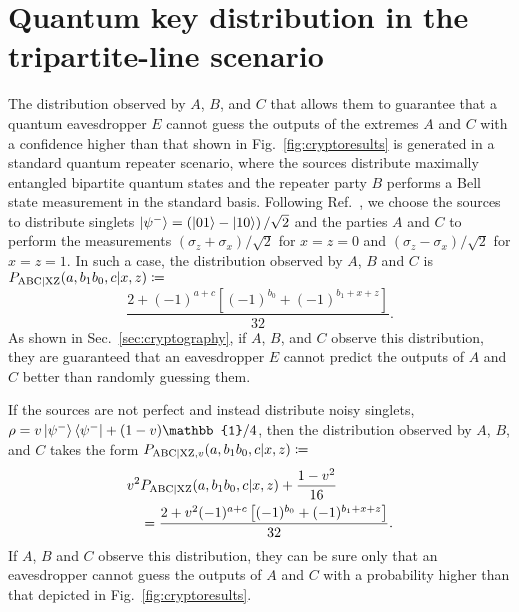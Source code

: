 \documentclass[superscriptaddress,aps,prx,nofootinbib,twocolumn,twoside,reprint,letterpaper,longbibliography]{revtex4-2}
\def\id{\boldsymbol{\mathbb{1}}}
\begin{document}
\section{Quantum key distribution in the tripartite-line scenario}\label{app:crypto}
The distribution observed by $A$, $B$, and $C$ that allows them to guarantee that a quantum eavesdropper $E$ cannot guess the outputs of the extremes $A$ and $C$ with a confidence higher than that shown in Fig.~\ref{fig:cryptoresults} is generated in a standard quantum repeater scenario, where the sources distribute maximally entangled bipartite quantum states and the repeater party $B$ performs a Bell state measurement in the standard basis.
Following Ref.~\cite{lee2018crypto}, we choose the sources to distribute singlets $\ket{\psi^-}=\left(\ket{01}-\ket{10}\right)/\sqrt{2}$ and the parties $A$ and $C$ to perform the measurements $\left(\sigma_z+\sigma_x\right)/\sqrt{2}$ for $x{=}z{=}0$ and $\left(\sigma_z-\sigma_x\right)/\sqrt{2}$ for $x{=}z{=}1$.
In such a case, the distribution observed by $A$, $B$ and $C$ is $P_{\text{ABC{\textbar}XZ}}(a,b_1b_0,c|x,z)\coloneqq$
\begin{equation*}
    \frac{2+(-1)^{a+c}\left[(-1)^{b_0}+(-1)^{b_1+x+z}\right]}{32}.
\end{equation*}
As shown in Sec.~\ref{sec:cryptography}, if $A$, $B$, and $C$ observe this distribution, they are guaranteed that an eavesdropper $E$ cannot predict the outputs of $A$ and $C$ better than randomly guessing them.

If the sources are not perfect and instead distribute noisy singlets, $\rho=v\ket{\psi^-}\bra{\psi^-}+(1-v)\id/4$, then the distribution observed by $A$, $B$, and $C$ takes the form $P_{\text{ABC{\textbar}XZ},v}(a,b_1b_0,c|x,z)\coloneqq$
\begin{align}
    v^2 &P_{\text{ABC{\textbar}XZ}}(a,b_1b_0,c|x,z) + \frac{1-v^2}{16} \notag\\
    &=\frac{2+v^2(-1)^{a+c}\left[(-1)^{b_0}+(-1)^{b_1+x+z}\right]}{32}.
    \label{eq:cryptodistribution}
\end{align}
If $A$, $B$ and $C$ observe this distribution, they can be sure only that an eavesdropper cannot guess the outputs of $A$ and $C$ with a probability higher than that depicted in Fig.~\ref{fig:cryptoresults}.
\end{document}
